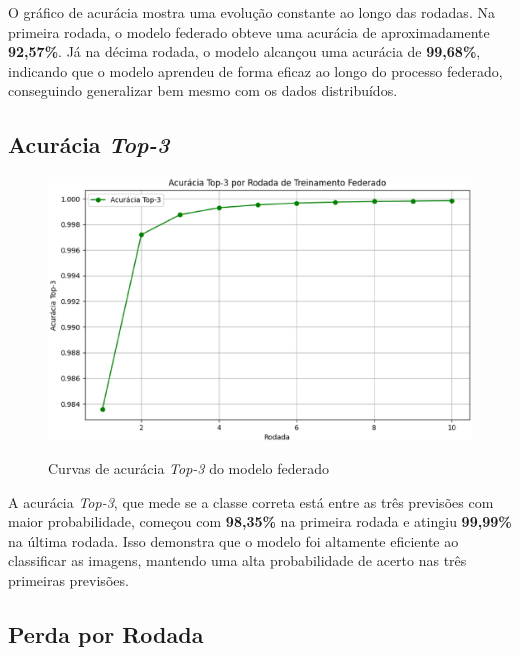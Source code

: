 O gráfico de acurácia mostra uma evolução constante ao longo das rodadas. Na primeira rodada, o modelo federado obteve uma acurácia de aproximadamente \textbf{92,57\%}. Já na décima rodada, o modelo alcançou uma acurácia de \textbf{99,68\%}, indicando que o modelo aprendeu de forma eficaz ao longo do processo federado, conseguindo generalizar bem mesmo com os dados distribuídos.

\subsection{Acurácia \textit{Top-3}}

\begin{figure}[ht]
    \centering
    \caption{Curvas de acurácia \textit{Top-3} do modelo federado}
    \includegraphics[scale=0.4]{figuras/analiseResultados/acuracyTop3Federated.eps}
    \label{fig:acuracyTop3Federated}
\end{figure}

A acurácia \textit{Top-3}, que mede se a classe correta está entre as três previsões com maior probabilidade, começou com \textbf{98,35\%} na primeira rodada e atingiu \textbf{99,99\%} na última rodada. Isso demonstra que o modelo foi altamente eficiente ao classificar as imagens, mantendo uma alta probabilidade de acerto nas três primeiras previsões.

\subsection{Perda por Rodada}

